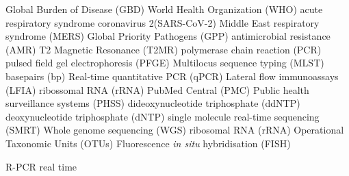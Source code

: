 Global Burden of Disease (GBD)
World Health Organization (WHO)
acute  respiratory  syndrome  coronavirus  2(SARS-CoV-2)
Middle East respiratory syndrome (MERS)
Global Priority Pathogens (GPP)
antimicrobial resistance (AMR)
T2 Magnetic Resonance (T2MR)
polymerase chain reaction (PCR)
pulsed field gel electrophoresis (PFGE)
Multilocus sequence typing (MLST)
basepairs (bp)
Real-time quantitative PCR (qPCR)
Lateral flow immunoassays (LFIA)
ribossomal RNA (rRNA)
PubMed Central\textsuperscript{\small\textregistered} (PMC)
Public health surveillance systems (PHSS)
dideoxynucleotide triphosphate (ddNTP) 
deoxynucleotide triphosphate (dNTP)
single molecule real-time sequencing (SMRT)
Whole genome sequencing (WGS)
ribosomal RNA (rRNA)
Operational Taxonomic Units (OTUs)
Fluorescence \textit{in situ} hybridisation (FISH) 

R-PCR real time 